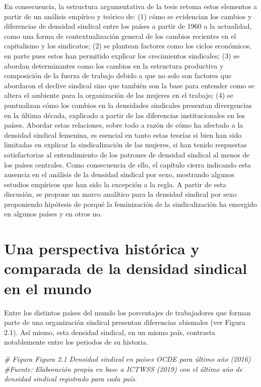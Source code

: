 \documentclass[
]{book}
\newenvironment{Shaded}{\begin{snugshade}}{\end{snugshade}}
\newcommand{\CommentTok}[1]{\textcolor[rgb]{0.56,0.35,0.01}{\textit{#1}}}
\begin{document}
En consecuencia, la estructura argumentativa de la tesis retoma estos elementos a partir de un análisis empírico y teórico de: (1) cómo se evidencian los cambios y diferencias de densidad sindical entre los países a partir de 1960 a la actualidad, como una forma de contextualización general de los cambios recientes en el capitalismo y los sindicatos; (2) se plantean factores como los ciclos económicos, en parte pues estos han permitido explicar los crecimientos sindicales; (3) se abordan determinantes como los cambios en la estructura productiva y composición de la fuerza de trabajo debido a que no solo son factores que abordaron el declive sindical sino que también son la base para entender como se altera el ambiente para la organización de las mujeres en el trabajo; (4) se puntualizan cómo los cambios en la densidades sindicales presentan divergencias en la última década, explicado a partir de las diferencias institucionales en los países. Abordar estas relaciones, sobre todo a razón de cómo ha afectado a la densidad sindical femenina, es esencial en tanto estas teorías si bien han sido limitadas en explicar la sindicalización de las mujeres, si han tenido respuestas satisfactorias al entendimiento de los patrones de densidad sindical al menos de los países centrales. Como consecuencia de ello, el capítulo cierra indicando esta ausencia en el análisis de la densidad sindical por sexo, mostrando algunos estudios empíricos que han sido la excepción a la regla. A partir de esta discusión, se propone un marco analítico para la densidad sindical por sexo proponiendo hipótesis de porqué la feminización de la sindicalización ha emergido en algunos países y en otros no.

\hypertarget{una-perspectiva-histuxf3rica-y-comparada-de-la-densidad-sindical-en-el-mundo}{%
\section{Una perspectiva histórica y comparada de la densidad sindical en el mundo}\label{una-perspectiva-histuxf3rica-y-comparada-de-la-densidad-sindical-en-el-mundo}}

Entre los distintos países del mundo los porcentajes de trabajadores que forman parte de una organización sindical presentan diferencias abismales (ver Figura 2.1). Así mismo, esta densidad sindical, en un mismo país, contrasta notablemente entre los periodos de su historia.

\begin{Shaded}
\begin{Highlighting}[]
\CommentTok{# Figura Figura 2.1 Densidad sindical en países OCDE para último año (2016)}
\CommentTok{#Fuente: Elaboración propia en base a ICTWSS (2019) con el último año de densidad sindical registrado para cada país. }
\end{Highlighting}
\end{Shaded}
\end{document}
